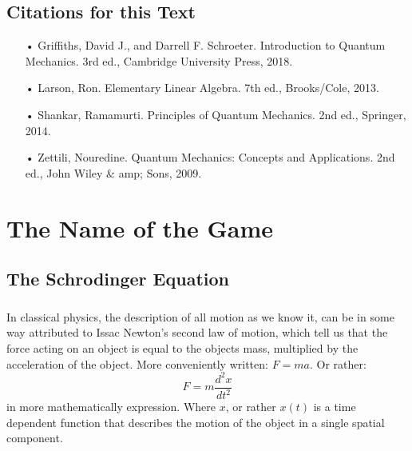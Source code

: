 \documentclass[12pt,letterpaper]{book}
\begin{document}
\pagebreak



\section*{Citations for this Text}
\begin{enumerate}
\item[•]Griffiths, David J., and Darrell F. Schroeter. Introduction to Quantum Mechanics. 3rd ed., Cambridge University Press, 2018.
\item[•]Larson, Ron. Elementary Linear Algebra. 7th ed., Brooks/Cole, 2013.
\item[•]Shankar, Ramamurti. Principles of Quantum Mechanics. 2nd ed., Springer, 2014.
\item[•]Zettili, Nouredine. Quantum Mechanics: Concepts and Applications. 2nd ed., John Wiley \& amp; Sons, 2009.
\end{enumerate}

\vspace{16cm}
\pagebreak


\chapter{The Name of the Game}


\section{The Schrodinger Equation}

\paragraph*{}In classical physics, the description of all motion as we know it, can be in some way attributed to Issac Newton's second law of motion, which tell us that the force acting on an object is equal to the objects mass, multiplied by the acceleration of the object. More conveniently written: $F = ma$. Or rather:
\begin{equation}
\label{Newtons 2nd Law}
F = m\frac{d^2x}{dt^2}
\end{equation} 
in more mathematically expression. Where $x$, or rather $x(t)$ is a time dependent function that describes the motion of the object in a single spatial component.
\end{document}
